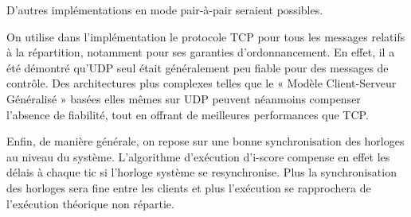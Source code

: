 \documentclass[10pt]{article}
\begin{document}
D'autres implémentations en mode pair-à-pair seraient possibles. 

On utilise dans l'implémentation le protocole TCP pour tous les messages relatifs à la répartition, notamment pour ses garanties d'ordonnancement.
En effet, il a été démontré qu'UDP seul était généralement peu fiable pour des messages de contrôle. 
Des architectures plus complexes telles que le « Modèle Client-Serveur Généralisé » basées elles mêmes sur UDP peuvent néanmoins compenser l'absence de fiabilité\cite{mckinney2012oscthulhu}, tout en offrant de meilleures performances que TCP.

Enfin, de manière générale, on repose sur une bonne synchronisation des horloges au niveau du système.
L'algorithme d'exécution d'i-score compense en effet les délais à chaque tic si l'horloge système se resynchronise.
Plus la synchronisation des horloges sera fine entre les clients et plus l'exécution se rapprochera de l'exécution théorique non répartie.








\end{document}
